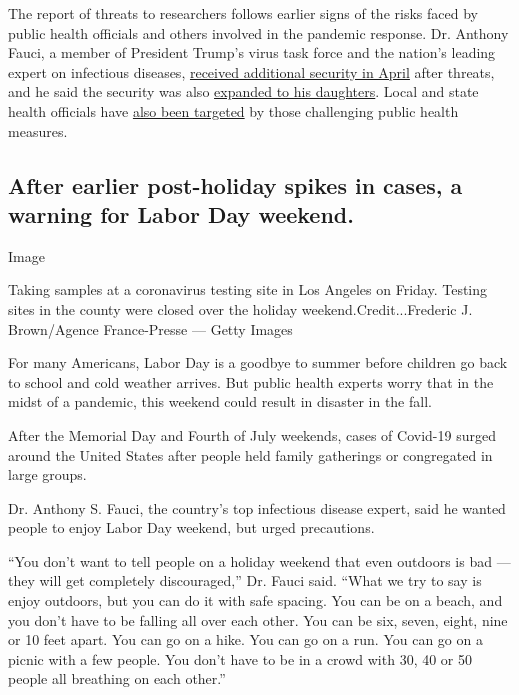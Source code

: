 The report of threats to researchers follows earlier signs of the risks
faced by public health officials and others involved in the pandemic
response. Dr. Anthony Fauci, a member of President Trump's virus task
force and the nation's leading expert on infectious diseases,
\href{https://www.nytimes3xbfgragh.onion/2020/04/01/us/politics/coronavirus-fauci-security.html}{received
additional security in April} after threats, and he said the security
was also
\href{https://www.cnbc.com/2020/08/05/dr-fauci-says-his-daughters-need-security-as-family-continues-to-get-death-threats.html}{expanded
to his daughters}. Local and state health officials have
\href{https://www.nytimes3xbfgragh.onion/2020/06/22/us/coronavirus-health-officials.html}{also
been targeted} by those challenging public health measures.

\hypertarget{after-earlier-post-holiday-spikes-in-cases-a-warning-for-labor-day-weekend}{%
\subsection{After earlier post-holiday spikes in cases, a warning for
Labor Day
weekend.}\label{after-earlier-post-holiday-spikes-in-cases-a-warning-for-labor-day-weekend}}

Image

Taking samples at a coronavirus testing site in Los Angeles on Friday.
Testing sites in the county were closed over the holiday
weekend.Credit...Frederic J. Brown/Agence France-Presse --- Getty Images

For many Americans, Labor Day is a goodbye to summer before children go
back to school and cold weather arrives. But public health experts worry
that in the midst of a pandemic, this weekend could result in disaster
in the fall.

After the Memorial Day and Fourth of July weekends, cases of Covid-19
surged around the United States after people held family gatherings or
congregated in large groups.

Dr. Anthony S. Fauci, the country's top infectious disease expert, said
he wanted people to enjoy Labor Day weekend, but urged precautions.

``You don't want to tell people on a holiday weekend that even outdoors
is bad --- they will get completely discouraged,'' Dr. Fauci said.
``What we try to say is enjoy outdoors, but you can do it with safe
spacing. You can be on a beach, and you don't have to be falling all
over each other. You can be six, seven, eight, nine or 10 feet apart.
You can go on a hike. You can go on a run. You can go on a picnic with a
few people. You don't have to be in a crowd with 30, 40 or 50 people all
breathing on each other.''

